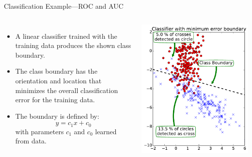 \documentclass[10pt, aspectratio=169]{beamer} %
\begin{document}
\begin{frame}{Classification Example---ROC and AUC}
\begin{columns}
\begin{itemize}
\item A linear classifier trained with the training data
produces the shown class boundary.
\item The class boundary has the orientation and location 
that minimizes the overall classification error for the training data.
\item The boundary is defined by:
\[
y = c_1 x + c_0
\]
with parameters $c_1$ and $c_0$ learned from data.
\end{itemize}
\centerline{\includegraphics[width=\columnwidth]{2classBoundary.pdf}}
\end{columns}
\end{frame}
\end{document}
